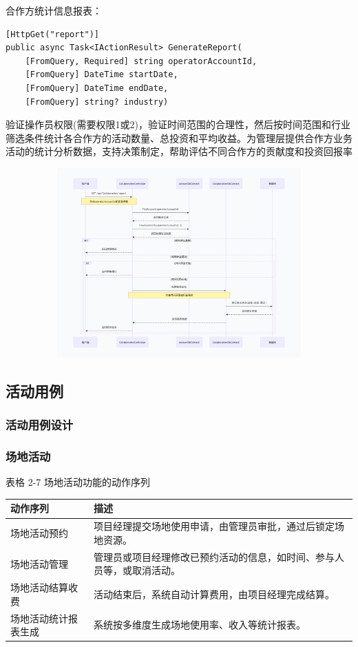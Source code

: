 \documentclass[]{article}
\let\oldincludegraphics\includegraphics
\renewcommand{\includegraphics}[2][]{%
  \begin{center}\oldincludegraphics[#1]{#2}\end{center}%
}
\begin{document}
合作方统计信息报表：

\begin{verbatim}
[HttpGet("report")]
public async Task<IActionResult> GenerateReport(
    [FromQuery, Required] string operatorAccountId,
    [FromQuery] DateTime startDate,
    [FromQuery] DateTime endDate,
    [FromQuery] string? industry)
\end{verbatim}

验证操作员权限(需要权限1或2)，验证时间范围的合理性，然后按时间范围和行业筛选条件统计各合作方的活动数量、总投资和平均收益。为管理层提供合作方业务活动的统计分析数据，支持决策制定，帮助评估不同合作方的贡献度和投资回报率

\includegraphics[width=5.64167in,height=2.86458in]{media/media/image_2-4-8.png}

\hypertarget{ux6d3bux52a8ux7528ux4f8b}{%
\subsection{活动用例}\label{ux6d3bux52a8ux7528ux4f8b}}

\hypertarget{ux6d3bux52a8ux7528ux4f8bux8bbeux8ba1}{%
\subsubsection{活动用例设计}\label{ux6d3bux52a8ux7528ux4f8bux8bbeux8ba1}}

\subsubsection{场地活动}

表格 2-7 场地活动功能的动作序列
\begin{longtable}[]{@{}ll@{}}
\toprule
动作序列 & 描述\tabularnewline
\midrule
\endhead
场地活动预约 & 项目经理提交场地使用申请，由管理员审批，通过后锁定场地资源。\tabularnewline
场地活动管理 & 管理员或项目经理修改已预约活动的信息，如时间、参与人员等，或取消活动。\tabularnewline
场地活动结算收费 & 活动结束后，系统自动计算费用，由项目经理完成结算。\tabularnewline
场地活动统计报表生成 & 系统按多维度生成场地使用率、收入等统计报表。\tabularnewline
\bottomrule
\end{longtable}
\end{document}
